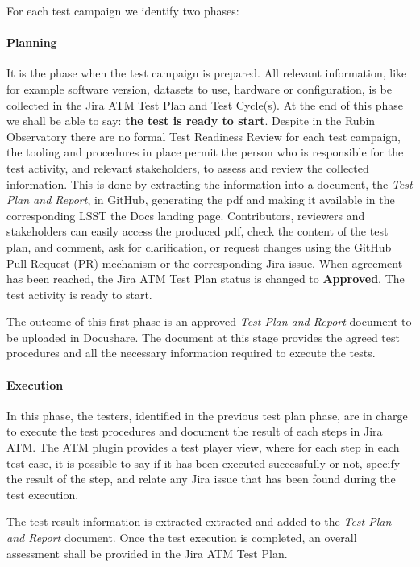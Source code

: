 For each test campaign we identify two phases:

\paragraph{Planning}
It is the phase when the test campaign is prepared. All relevant information, like for example software version, datasets to use, hardware or configuration, 
is be collected in the Jira ATM Test Plan and Test Cycle(s). 
At the end of this phase we shall be able to say: \textbf{the test is ready to start}.
Despite in the Rubin Observatory there are no formal Test Readiness Review for each test campaign, 
the tooling and procedures in place permit the person who is responsible for the test activity, and relevant stakeholders, to assess and review the collected information. 
This is done by extracting the information into a document, the \textit{Test Plan and Report}, in GitHub, generating the pdf and making it available
in the corresponding LSST the Docs landing page. Contributors, reviewers and stakeholders can easily access the produced pdf,
check the content of the test plan, and comment, ask for clarification, or request changes using the GitHub
Pull Request (PR) mechanism or the corresponding Jira issue.
When agreement has been reached, the Jira ATM Test Plan status is changed to \textbf{Approved}. The test activity is ready to start.

The outcome of this first phase is an approved \textit{Test Plan and Report} document to be uploaded in Docushare. 
The document at this stage provides the agreed test procedures and all the necessary information required to execute the tests.

\paragraph{Execution}
In this phase, the testers, identified in the previous test plan phase, are in charge to execute the test procedures and 
document the result of each steps in Jira ATM.
The ATM plugin provides a test player view, where for each step in each test case, it is possible to say if it has been executed successfully or not,
specify the result of the step, and relate any Jira issue that has been found during the test execution.

The test result information is extracted extracted and added to the \textit{Test Plan and Report} document.
Once the test execution is completed, an overall assessment shall be provided in the Jira ATM Test Plan.

